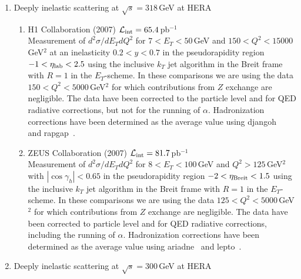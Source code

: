 \documentclass[11pt]{article}
\newcommand{\djangoh}{{\sc djangoh}}
\newcommand{\rapgap}{{\sc rapgap}}
\newcommand{\ariadne}{{\sc ariadne}}
\newcommand{\lepto}{{\sc lepto}}
\begin{document}
\begin{enumerate}
\begin{enumerate}
\end{enumerate}



\item Deeply inelastic scattering at $\sqrt{s} = 318\,$GeV at HERA
\begin{enumerate}

\item H1 Collaboration (2007) 
      ${\cal L_{\rm int}}=65.4\,$pb$^{-1}$~\cite{:2007pb} \\
Measurement of
$d^2\sigma/dE_T dQ^2$  for $7<E_T<50\,$GeV
    and $150<Q^2<15000\,$GeV$^2$
     at an inelasticity $0.2<y< 0.7$ 
     in the pseudorapidity region $-1<\eta_{\rm lab}<2.5$
using the
inclusive $k_T$ jet algorithm in the Breit frame with $R=1$ 
       in the $E_T$-scheme.
In these comparisons we are using the data 
$150<Q^2<5000\,$GeV$^2$ for which contributions from $Z$ exchange
are negligible. 
The data have been corrected to the particle level 
and for QED radiative corrections, 
but not for the running of $\alpha$. 
Hadronization corrections have been determined 
as the average value using 
\djangoh~\cite{Charchula:1994kf} and \rapgap~\cite{Jung:1993gf}.


\item ZEUS Collaboration (2007) 
      ${\cal L_{\rm int}}=81.7\,$pb$^{-1}$~\cite{Chekanov:2006xr} \\
Measurement of
$d^2\sigma/dE_T dQ^2$  for $8<E_T<100\,$GeV
    and $Q^2>125\,$GeV$^2$
     with $|\cos \gamma_h| < 0.65$
     in the pseudorapidity region $-2<\eta_{\rm Breit}<1.5$ 
using the
inclusive $k_T$ jet algorithm in the Breit frame with $R=1$ 
       in the $E_T$-scheme.
In these comparisons we are using the data 
$125<Q^2<5000\,$GeV$^2$ for which contributions from $Z$ exchange
are negligible. 
The data have been corrected to particle level 
and for QED radiative corrections, 
including the running of $\alpha$. 
Hadronization corrections have been determined 
as the average value using 
\ariadne~\cite{Lonnblad:1992tz,Lonnblad:1994wk}
and \lepto~\cite{Ingelman:1996mq}.



\end{enumerate}

\item Deeply inelastic scattering at $\sqrt{s} = 300\,$GeV at HERA
\begin{enumerate}


\end{enumerate}
\end{enumerate}
\end{document}
